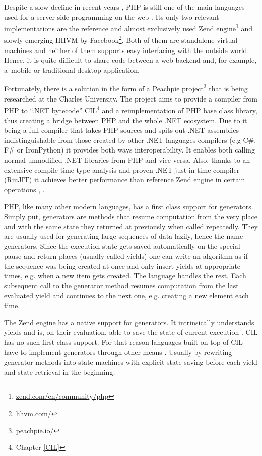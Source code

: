 
Despite a slow decline in recent years \citep{Tiobe}, PHP is still one of the main languages used for a server side programming on the web \citep{Stack}. Its only two relevant implementations are the reference and almost exclusively used Zend engine\footnote{\href{http://www.zend.com/en/community/php}{zend.com/en/community/php}} and slowly emerging HHVM by Facebook\footnote{\href{http://hhvm.com/}{hhvm.com/}}. Both of them are standalone virtual machines and neither of them supports easy interfacing with the outside world. Hence, it is quite difficult to share code between a web backend and, for example, a~mobile or traditional desktop application.

Fortunately, there is a solution in the form of a Peachpie project\footnote{\href{http://www.peachpie.io/}{peachpie.io/}} that is being researched at the Charles University. The project aims to provide a compiler from PHP to “.NET bytecode” CIL\footnote{Chapter \ref{CIL}} and a reimplementation of PHP base class library, thus creating a bridge between PHP and the whole .NET ecosystem. Due to it being a full compiler that takes PHP sources and spits out .NET assemblies indistinguishable from those created by other .NET languages compilers (e.g C\#, F\# or IronPython) it provides both ways interoperability. It enables both calling normal unmodified .NET libraries from PHP and vice versa. Also, thanks to an extensive compile-time type analysis and proven .NET just in time compiler (RiuJIT) it achieves better performance than reference Zend engine in certain operations \citep{PchpBenchBlog}, \citep{PchpBenchSite}.

PHP, like many other modern languages, has a first class support for generators. Simply put, generators are methods that resume computation from the very place and with the same state they returned at previously when called repeatedly. They are usually used for generating large sequences of data lazily, hence the name generators. Since the execution state gets saved automatically on the special pause and return places (usually called yields) one can write an algorithm as if the sequence was being created at once and only insert yields at appropriate times, e.g. when a new item gets created. The language handles the rest. Each subsequent call to the generator method resumes computation from the last evaluated yield and continues to the next one, e.g. creating a new element each time. 

The Zend engine has a native support for generators. It intrinsically understands yields and is, on their evaluation, able to save the state of current execution \citep{ZendGen}. CIL has no such first class support. For that reason languages built on top of CIL have to implement generators through other means \citep{CSharpGen}. Usually by rewriting generator methods into state machines with explicit state saving before each yield and state retrieval in the beginning.

